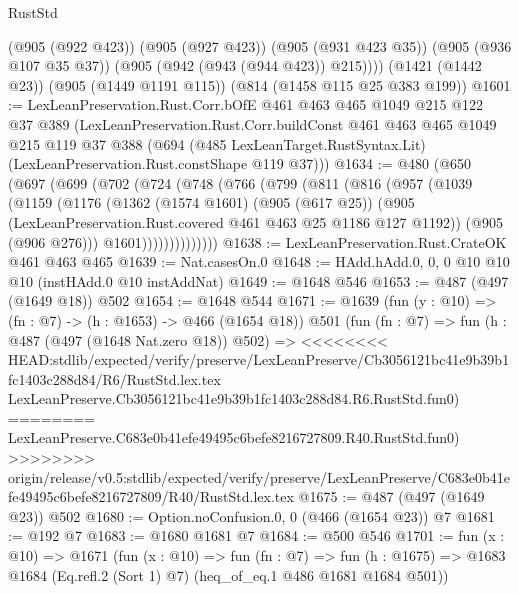 \begin{lexlean}{RustStd}
\begin{coremodule}
{\begin{coremodule}
{{{{{        (@905 (@922 @423))
        (@905 (@927 @423))
        (@905 (@931 @423 @35))
        (@905 (@936 @107 @35 @37))
        (@905 (@942 (@943 (@944 @423)) @215))))
    (@1421 (@1442 @23))
    (@905 (@1449 @1191 @115))
    (@814 (@1458 @115 @25 @383 @199))
@1601 := LexLeanPreservation.Rust.Corr.bOfE
    @461
    @463
    @465
    @1049
    @215
    @122
    @37
    @389
    (LexLeanPreservation.Rust.Corr.buildConst
      @461
      @463
      @465
      @1049
      @215
      @119
      @37
      @388
      (@694 (@485 LexLeanTarget.RustSyntax.Lit) (LexLeanPreservation.Rust.constShape @119 @37)))
@1634 := @480
    (@650
      (@697
        (@699
          (@702
            (@724
              (@748
                (@766
                  (@799
                    (@811
                      (@816
                        (@957
                          (@1039
                            (@1159
                              (@1176
                                (@1362
                                  (@1574 @1601)
                                  (@905 (@617 @25))
                                  (@905
                                    (LexLeanPreservation.Rust.covered
                                      @461
                                      @463
                                      @25
                                      @1186
                                      @127
                                      @1192))
                                  (@905 (@906 @276)))
                                @1601))))))))))))))
@1638 := LexLeanPreservation.Rust.CrateOK @461 @463 @465
@1639 := Nat.casesOn.{0}
@1648 := HAdd.hAdd.{0, 0, 0} @10 @10 @10 (instHAdd.{0} @10 instAddNat)
@1649 := @1648 @546
@1653 := @487 (@497 (@1649 @18)) @502
@1654 := @1648 @544
@1671 := @1639
    (fun (y : @10) => (fn : @7) -> (h : @1653) -> @466 (@1654 @18))
    @501
    (fun (fn : @7) =>
    fun (h : @487 (@497 (@1648 Nat.zero @18)) @502) =>
<<<<<<<< HEAD:stdlib/expected/verify/preserve/LexLeanPreserve/Cb3056121bc41e9b39b1fc1403c288d84/R6/RustStd.lex.tex
    LexLeanPreserve.Cb3056121bc41e9b39b1fc1403c288d84.R6.RustStd.fun0)
========
    LexLeanPreserve.C683e0b41efe49495c6befe8216727809.R40.RustStd.fun0)
>>>>>>>> origin/release/v0.5:stdlib/expected/verify/preserve/LexLeanPreserve/C683e0b41efe49495c6befe8216727809/R40/RustStd.lex.tex
@1675 := @487 (@497 (@1649 @23)) @502
@1680 := Option.noConfusion.{0, 0} (@466 (@1654 @23)) @7
@1681 := @192 @7
@1683 := @1680 @1681 @7
@1684 := @500 @546
@1701 := fun (x : @10) =>
  @1671
    (fun (x : @10) =>
    fun (fn : @7) =>
    fun (h : @1675) => @1683 @1684 (Eq.refl.{2} (Sort 1) @7) (heq_of_eq.{1} @486 @1681 @1684 @501))
}}}}}
\end{coremodule}}
\end{coremodule}
\end{lexlean}
